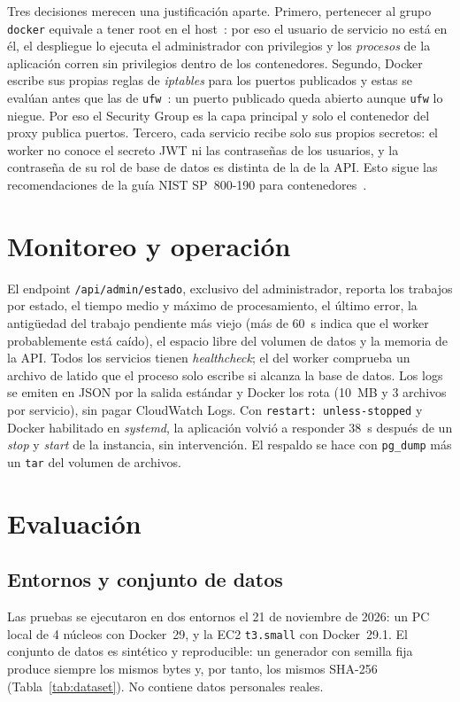 \documentclass[conference,a4paper]{IEEEtran}
\newcommand{\cod}[1]{\texttt{#1}}
\begin{document}
Tres decisiones merecen una justificación aparte. Primero, pertenecer al grupo \cod{docker} equivale a tener root en el host~\cite{docker-sec}: por eso el usuario de servicio no está en él, el despliegue lo ejecuta el administrador con privilegios y los \emph{procesos} de la aplicación corren sin privilegios dentro de los contenedores. Segundo, Docker escribe sus propias reglas de \textit{iptables} para los puertos publicados y estas se evalúan antes que las de \cod{ufw}~\cite{docker-fw}: un puerto publicado queda abierto aunque \cod{ufw} lo niegue. Por eso el Security Group es la capa principal y solo el contenedor del proxy publica puertos. Tercero, cada servicio recibe solo sus propios secretos: el worker no conoce el secreto JWT ni las contraseñas de los usuarios, y la contraseña de su rol de base de datos es distinta de la de la API. Esto sigue las recomendaciones de la guía NIST SP~800-190 para contenedores~\cite{nist190}.

\section{Monitoreo y operación}\label{sec:ops}

El endpoint \cod{/api/admin/estado}, exclusivo del administrador, reporta los trabajos por estado, el tiempo medio y máximo de procesamiento, el último error, la antigüedad del trabajo pendiente más viejo (más de 60~s indica que el worker probablemente está caído), el espacio libre del volumen de datos y la memoria de la API. Todos los servicios tienen \textit{healthcheck}; el del worker comprueba un archivo de latido que el proceso solo escribe si alcanza la base de datos. Los logs se emiten en JSON por la salida estándar y Docker los rota (10~MB y 3 archivos por servicio), sin pagar CloudWatch Logs. Con \cod{restart: unless-stopped} y Docker habilitado en \textit{systemd}, la aplicación volvió a responder 38~s después de un \textit{stop} y \textit{start} de la instancia, sin intervención. El respaldo se hace con \cod{pg\_dump} más un \cod{tar} del volumen de archivos.

\section{Evaluación}\label{sec:eval}

\subsection{Entornos y conjunto de datos}
Las pruebas se ejecutaron en dos entornos el 21 de noviembre de 2026: un PC local de 4 núcleos con Docker~29, y la EC2 \cod{t3.small} con Docker~29.1. El conjunto de datos es sintético y reproducible: un generador con semilla fija produce siempre los mismos bytes y, por tanto, los mismos SHA-256 (Tabla~\ref{tab:dataset}). No contiene datos personales reales.
\end{document}
